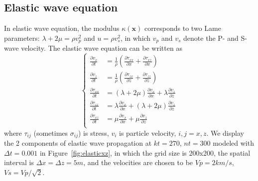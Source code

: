 


\subsection{Elastic wave equation}

In elastic wave equation, the modulus $\kappa(\textbf{x})$ corresponds to two Lame parameters: $\lambda+2\mu=\rho v_p^2$ and $u=\rho v_s^2$, in which $v_p$ and $v_s$ denote the P- and S-wave velocity. The elastic wave equation can be written as
\begin{equation}\label{eq:elastic}
\left\{
\begin{split}
	\frac{\partial v_x}{\partial t} &=\frac{1}{\rho} (\frac{\partial \tau_{xx}}{\partial x}+\frac{\partial \tau_{xz}}{\partial x})\\
	\frac{\partial v_z}{\partial t} &=\frac{1}{\rho} (\frac{\partial \tau_{zx}}{\partial z}+\frac{\partial \tau_{zz}}{\partial z})\\	
	\frac{\partial\tau_{xx}}{\partial t} &=(\lambda+2\mu)\frac{\partial v_x}{\partial x}+\lambda\frac{\partial v_z}{\partial z}\\
	\frac{\partial\tau_{zz}}{\partial t} &=\lambda\frac{\partial v_x}{\partial x}+(\lambda+2\mu)\frac{\partial v_z}{\partial z}\\
	\frac{\partial\tau_{xz}}{\partial t} &=\mu \frac{\partial v_x}{\partial x}+\mu\frac{\partial v_z}{\partial z}\\
\end{split}\right.
\end{equation}
where $\tau_{ij}$ (sometimes $\sigma_{ij}$) is stress, $v_i$ is particle velocity, $i,j=x,z$. We display the 2 components of elastic wave propagation at $kt=270$, $nt=300$ modeled with $\Delta t=0.001$ in Figure~\ref{fig:elasticxz}, in which the grid size is 200x200, the spatial interval is $\Delta x=\Delta z=5m$, and the velocities are chosen to be $Vp=2km/s$, $Vs=Vp/\sqrt{2}$.

% 


